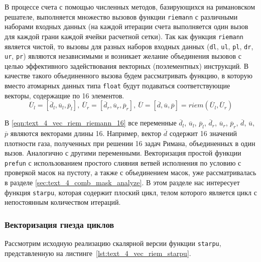 В процессе счета с помощью численных методов, базирующихся на римановском решателе, выполняется множество вызовов функции \texttt{riemann} с различными наборами входных данных (на каждой итерации счета выполняется один вызов для каждой грани каждой ячейки расчетной сетки).
Так как функция \texttt{riemann} является чистой, то вызовы для разных наборов входных данных (\texttt{dl}, \texttt{ul}, \texttt{pl}, \texttt{dr}, \texttt{ur}, \texttt{pr}) являются независимыми и возникает желание объединения вызовов с целью эффективного задействования векторных (поэлементных) инструкций.
В качестве такого объединенного вызова будем рассматривать функцию, в которую вместо атомарных данных типа \texttt{float} будут подаваться соответствующие векторы, содержащие по 16 элементов.
\begin{equation}\label{eqn:text_4_vec_riem_riemann_16}
\overline{U}_l = [\overline{d}_l, \overline{u}_l, \overline{p}_l], \ 
\overline{U}_r = [\overline{d}_r, \overline{u}_r, \overline{p}_r], \ 
\overline{U} = [\overline{d}, \overline{u}, \overline{p}] = riem(\overline{U}_l, \overline{U}_r)
\end{equation}

В \eqref{eqn:text_4_vec_riem_riemann_16} все переменные $\overline{d}_l$, $\overline{u}_l$, $\overline{p}_l$, $\overline{d}_r$, $\overline{u}_r$, $\overline{p}_r$, $\overline{d}$, $\overline{u}$, $\overline{p}$ являются векторами длины 16.
Например, вектор $\overline{d}$ содержит 16 значений плотности газа, полученных при решении 16 задач Римана, объединенных в один вызов.
Аналогично с другими переменными.
Векторизация простой функции \texttt{prefun} с использованием простого слияния ветвей исполнения по условию\label{term:meth_vec_merge3} с проверкой масок на пустоту\label{term:meth_vec_check2}, а также с объединением масок\label{term:meth_vec_union2}, уже рассматривалась в разделе \ref{sec:text_4_comb_mask_analyze}.
В этом разделе нас интересует функция \texttt{starpu}, которая содержит плоский цикл, телом которого является цикл с непостоянным количеством итераций.

\subsubsection{Векторизация гнезда циклов}

Рассмотрим исходную реализацию скалярной версии функции \texttt{starpu}, представленную на листинге~\ref{lst:text_4_vec_riem_starpu}.

